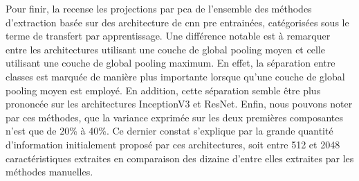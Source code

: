 Pour finir, la  recense les projections par \gls{pca} de l'ensemble des méthodes d'extraction basée sur des architecture de \gls{cnn} pre entrainées, catégorisées sous le terme de transfert par apprentissage. Une différence notable est à remarquer entre les architectures utilisant une couche de global pooling moyen et celle utilisant une couche de global pooling maximum. En effet, la séparation entre classes est marquée de manière plus importante lorsque qu'une couche de global pooling moyen est employé. En addition, cette séparation semble être plus prononcée sur les architectures InceptionV3 et ResNet. Enfin, nous pouvons noter par ces méthodes, que la variance exprimée sur les deux premières composantes n'est que de 20\% à 40\%. Ce dernier constat s'explique par la grande quantité d'information initialement proposé par ces architectures, soit entre 512 et 2048 caractéristiques extraites en comparaison des dizaine d'entre elles extraites par les méthodes manuelles.\par

